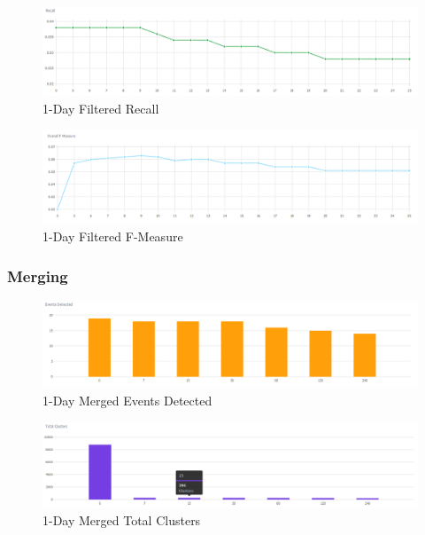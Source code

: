 \documentclass[a4paper,portrait,12pt]{article}
\begin{document}
\begin{figure}[]
	\centering
	\includegraphics[width=\linewidth]{images/1day-filtered-recall.png}
	\caption{1-Day Filtered Recall}
	\label{fig:1day-filtered-recall}
\end{figure}

\begin{figure}[H]
	\centering
	\includegraphics[width=\linewidth]{images/1day-filtered-f-measure.png}
	\caption{1-Day Filtered F-Measure}
	\label{fig:1day-filtered-f-measure}
\end{figure}

\subsubsection{Merging}

\begin{figure}[H]
	\centering
	\includegraphics[width=\linewidth]{images/1day-merged-events-detected.png}
	\caption{1-Day Merged Events Detected}
	\label{fig:1day-merged-events-detected}
\end{figure}

\begin{figure}[H]
	\centering
	\includegraphics[width=\linewidth]{images/1day-merged-total-clusters.png}
	\caption{1-Day Merged Total Clusters}
	\label{fig:1day-merged-total-clusters}
\end{figure}
\end{document}

